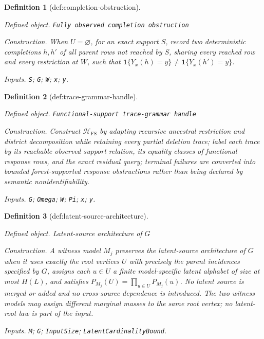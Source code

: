 \documentclass{article}
\newtheorem{definition}{Definition}
\begin{document}
\begin{definition}[def:completion-obstruction]\label{def:completion-obstruction}
\par\smallskip\noindent\emph{Defined object.} \texttt{Fully observed completion obstruction}
\par\smallskip\noindent\emph{Construction.} When \(U=\varnothing\), for an exact support \(S\), record two deterministic completions \(h,h'\) of all parent rows not reached by \(S\), sharing every reached row and every restriction at \(W\), such that \(\mathbf 1\{Y_x(h)=y\}\ne\mathbf 1\{Y_x(h')=y\}\).
\par\smallskip\noindent\emph{Inputs.} \texttt{S}; \texttt{G}; \texttt{W}; \texttt{x}; \texttt{y}.
\end{definition}

\begin{definition}[def:trace-grammar-handle]\label{def:trace-grammar-handle}
\par\smallskip\noindent\emph{Defined object.} \texttt{Functional-\allowbreak{}support trace-\allowbreak{}grammar handle}
\par\smallskip\noindent\emph{Construction.} Construct \(\mathcal H_{\mathrm{FS}}\) by adapting recursive ancestral restriction and district decomposition while retaining every partial deletion trace; label each trace by its reachable observed support relation, its equality classes of functional response rows, and the exact residual query; terminal failures are converted into bounded forest-supported response obstructions rather than being declared by semantic nonidentifiability.
\par\smallskip\noindent\emph{Inputs.} \texttt{G}; \texttt{Omega}; \texttt{W}; \texttt{Pi}; \texttt{x}; \texttt{y}.
\end{definition}

\begin{definition}[def:latent-source-architecture]\label{def:latent-source-architecture}
\par\smallskip\noindent\emph{Defined object.} Latent-source architecture of \(G\)
\par\smallskip\noindent\emph{Construction.} A witness model \(M_j\) preserves the latent-source architecture of \(G\) when it uses exactly the root vertices \(U\) with precisely the parent incidences specified by \(G\), assigns each \(u\in U\) a finite model-specific latent alphabet of size at most \(H(L)\), and satisfies \(P_{M_j}(U)=\prod_{u\in U}P_{M_j}(u)\). No latent source is merged or added and no cross-source dependence is introduced. The two witness models may assign different marginal masses to the same root vertex; no latent-root law is part of the input.
\par\smallskip\noindent\emph{Inputs.} \texttt{M}; \texttt{G}; \texttt{InputSize}; \texttt{LatentCardinalityBound}.
\end{definition}
\end{document}
